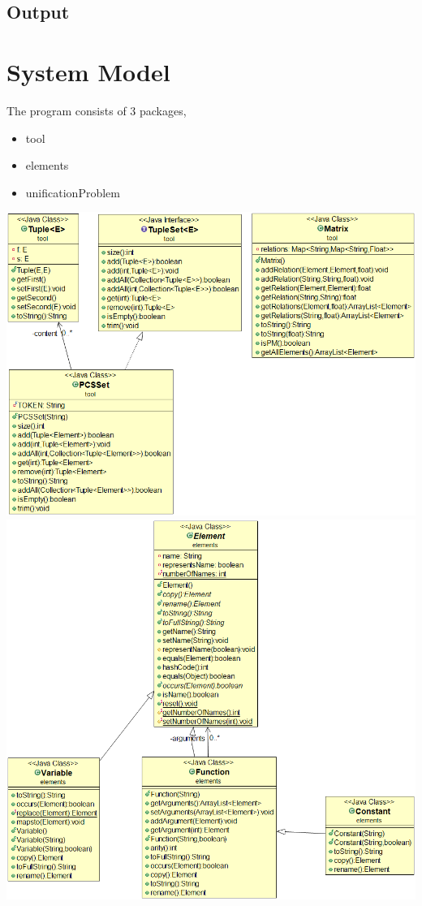 \documentclass{article}
\begin{document}

\subsection{Output}

\section{System Model}
The program consists of 3 packages,
\begin{itemize}
	\item tool
	\item elements
	\item unificationProblem
\end{itemize}
\includegraphics[scale=0.5]{ToolsModel}
\newpage
\includegraphics[scale=0.5]{ElementsModel}
\end{document}
